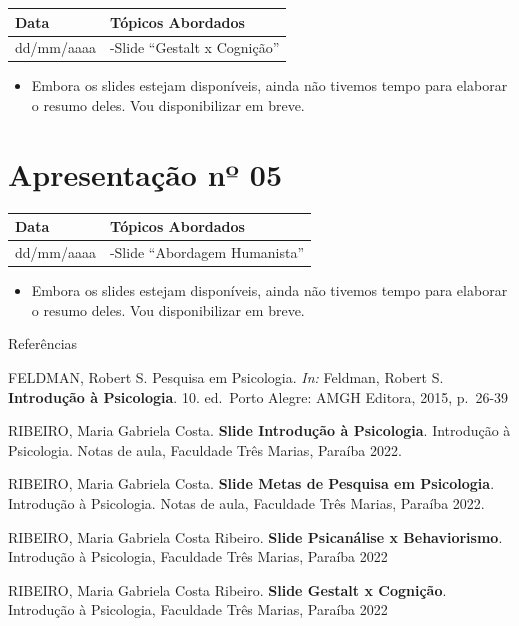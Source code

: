 \documentclass[
]{book}
\providecommand{\tightlist}{%
  \setlength{\itemsep}{0pt}\setlength{\parskip}{0pt}}
\begin{document}
\begin{longtable}[]{@{}ll@{}}
\toprule()
Data & Tópicos Abordados \\
\midrule()
\endhead
dd/mm/aaaa & -Slide ``Gestalt x Cognição'' \\
\bottomrule()
\end{longtable}

\begin{itemize}
\tightlist
\item
  Embora os slides estejam disponíveis, ainda não tivemos tempo para elaborar o resumo deles. Vou disponibilizar em breve.
\end{itemize}

\hypertarget{apresentauxe7uxe3o-nuxba-05}{%
\section{Apresentação nº 05}\label{apresentauxe7uxe3o-nuxba-05}}

\begin{longtable}[]{@{}ll@{}}
\toprule()
Data & Tópicos Abordados \\
\midrule()
\endhead
dd/mm/aaaa & -Slide ``Abordagem Humanista'' \\
\bottomrule()
\end{longtable}

\begin{itemize}
\tightlist
\item
  Embora os slides estejam disponíveis, ainda não tivemos tempo para elaborar o resumo deles. Vou disponibilizar em breve.
\end{itemize}

Referências

FELDMAN, Robert S. Pesquisa em Psicologia. \emph{In:} Feldman, Robert S. \textbf{Introdução à Psicologia}. 10. ed.~Porto Alegre: AMGH Editora, 2015, p.~26-39

RIBEIRO, Maria Gabriela Costa. \textbf{Slide Introdução à Psicologia}. Introdução à Psicologia. Notas de aula, Faculdade Três Marias, Paraíba 2022.

RIBEIRO, Maria Gabriela Costa. \textbf{Slide Metas de Pesquisa em Psicologia}. Introdução à Psicologia. Notas de aula, Faculdade Três Marias, Paraíba 2022.

RIBEIRO, Maria Gabriela Costa Ribeiro. \textbf{Slide Psicanálise x Behaviorismo}. Introdução à Psicologia, Faculdade Três Marias, Paraíba 2022

RIBEIRO, Maria Gabriela Costa Ribeiro. \textbf{Slide Gestalt x Cognição}. Introdução à Psicologia, Faculdade Três Marias, Paraíba 2022
\end{document}
